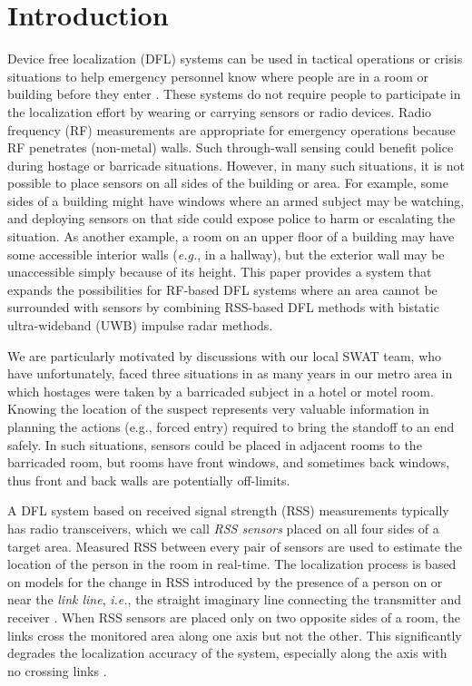 \documentclass[conference]{IEEEtran}
\begin{document}
\section{Introduction} \label{sec:introduction}

Device free localization (DFL) systems can be used in tactical
operations or crisis situations to help emergency personnel know where
people are in a room or building before they enter
\cite{Wilson_VRTI_2011}. These systems do not require people to
participate in the localization effort by wearing or carrying sensors
or radio devices. Radio frequency (RF) measurements are appropriate
for emergency operations because RF penetrates (non-metal) walls.
Such through-wall sensing could benefit police during hostage or
barricade situations.  However, in many such situations, it is not
possible to place sensors on all sides of the building or area.  For
example, some sides of a building might have windows where an armed
subject may be watching, and deploying sensors on that side could
expose police to harm or escalating the situation. As another example,
a room on an upper floor of a building may have some accessible
interior walls (\emph{e.g.}, in a hallway), but the exterior wall may
be unaccessible simply because of its height.  This paper provides a
system that expands the possibilities for RF-based DFL systems where
an area cannot be surrounded with sensors by combining RSS-based DFL
methods with bistatic ultra-wideband (UWB) impulse radar methods.

We are particularly motivated by discussions with our local SWAT team,
who have unfortunately, faced three situations in as many years in our
metro area \cite{abc4,sltrib,deseret} in which hostages were taken by
a barricaded subject in a hotel or motel room. Knowing the location of
the suspect represents very valuable information in planning the
actions (e.g., forced entry) required to bring the standoff to an end
safely.  In such situations, sensors could be placed in adjacent rooms
to the barricaded room, but rooms have front windows, and sometimes
back windows, thus front and back walls are potentially off-limits.


A DFL system based on received signal strength (RSS) measurements
\cite{youssef07,Wilson_RTI_2010,Patwari_2010_IEEE,Kaltiokallio_RTCSA_2011}
typically has radio transceivers, which we call \emph{RSS sensors}
placed on all four sides of a target area. Measured RSS between every
pair of sensors are used to estimate the location of the person in the
room in real-time. The localization process is based on models for the
change in RSS introduced by the presence of a person on or near the
\emph{link line}, \emph{i.e.}, the straight imaginary line connecting
the transmitter and receiver
\cite{Wilson_RTI_2010,Patwari_corr_shadow_2008,Wilson_SkewL_2011}. When
RSS sensors are placed only on two opposite sides of a room, the links
cross the monitored area along one axis but not the other. This
significantly degrades the localization accuracy of the system,
especially along the axis with no crossing links
\cite{Wilson_RTI_2010}.
\end{document}
